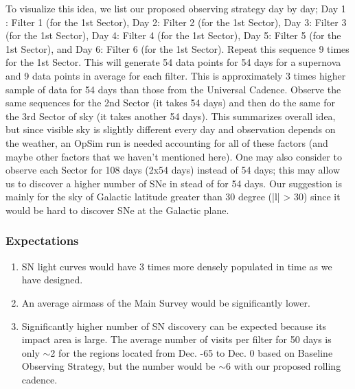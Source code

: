 To visualize this idea, we list our proposed observing strategy day by day; Day 1 :
Filter 1 (for the 1st Sector), Day 2: Filter 2 (for the 1st Sector), Day 3: Filter 3
(for the 1st Sector), Day 4: Filter 4 (for the 1st Sector), Day 5: Filter 5 (for the
1st Sector), and Day 6: Filter 6 (for the 1st Sector). Repeat this sequence 9 times
for the 1st Sector. This will generate 54 data points for 54 days for a supernova and
9 data points in average for each filter. This is approximately 3 times higher sample
of data for 54 days than those from the Universal Cadence. Observe the same sequences
for the 2nd Sector (it takes 54 days) and then do the same for the 3rd Sector of sky
(it takes another 54 days). This summarizes overall idea, but since visible sky is
slightly different every day and observation depends on the weather, an OpSim run is
needed accounting for all of these factors (and maybe other factors that we haven't
mentioned here). One may also consider to observe each Sector for 108 days (2x54
days) instead of 54 days; this may allow us to discover a higher number of SNe in
stead of for 54 days. Our suggestion is mainly for the sky of Galactic latitude
greater than 30 degree (|l| > 30) since it would be hard to discover SNe at the
Galactic plane.

\subsubsection{Expectations}

\begin{enumerate}
\item SN light curves would have 3 times more densely populated in time as we have designed.
\item An average airmass of the Main Survey would be significantly lower.
\item Significantly higher number of SN discovery can be expected because its impact area is
large. The average number of visits per filter for 50 days is only $\sim$2 for the regions
located from Dec. -65 to Dec. 0 based on Baseline Observing Strategy, but the number would
be $\sim$6 with our proposed rolling cadence.
\end{enumerate}






